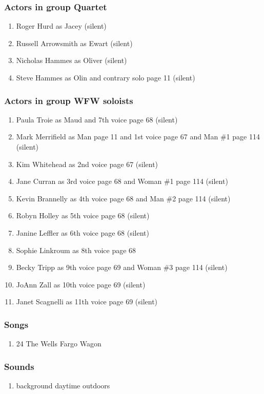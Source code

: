 \subsubsection{Actors in group Quartet}
\begin{enumerate}
\item Roger Hurd as Jacey (silent)
\item Russell Arrowsmith as Ewart (silent)
\item Nicholas Hammes as Oliver (silent)
\item Steve Hammes as Olin and contrary solo page 11 (silent)
\end{enumerate}
\subsubsection{Actors in group WFW soloists}
\begin{enumerate}
\item Paula Troie as Maud and 7th voice page 68 (silent)
\item Mark Merrifield as Man page 11 and 1st voice page 67 and Man \#1 page 114 (silent)
\item Kim Whitehead as 2nd voice page 67 (silent)
\item Jane Curran as 3rd voice page 68 and Woman \#1 page 114 (silent)
\item Kevin Brannelly as 4th voice page 68 and Man \#2 page 114 (silent)
\item Robyn Holley as 5th voice page 68 (silent)
\item Janine Leffler as 6th voice page 68 (silent)
\item Sophie Linkroum as 8th voice page 68
\item Becky Tripp as 9th voice page 69 and Woman \#3 page 114 (silent)
\item JoAnn Zall as 10th voice page 69 (silent)
\item Janet Scagnelli as 11th voice page 69 (silent)
\end{enumerate}

\subsubsection{Songs}
\begin{enumerate}
\item 24 The Wells Fargo Wagon
\end{enumerate}\subsubsection{Sounds}
\begin{enumerate}
\item background daytime outdoors
\end{enumerate}
